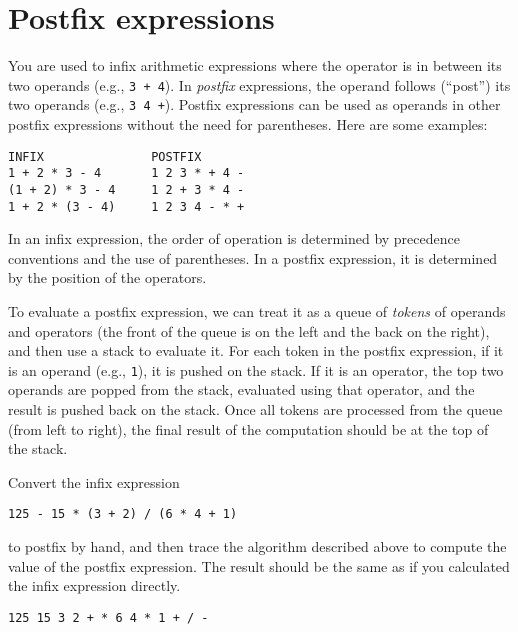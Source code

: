 \section*{Postfix expressions}

You are used to infix arithmetic expressions where the operator is in
between its two operands (e.g., \lstinline'3 + 4'). In \emph{postfix}
expressions, the operand follows (``post'') its two operands (e.g.,
\lstinline'3 4 +').  Postfix expressions can be used as operands in
other postfix expressions without the need for parentheses. Here are
some examples:

\begin{lstlisting}[basicstyle=\smallbasicstyle, belowskip=0pt]
INFIX               POSTFIX
1 + 2 * 3 - 4       1 2 3 * + 4 -
(1 + 2) * 3 - 4     1 2 + 3 * 4 -
1 + 2 * (3 - 4)     1 2 3 4 - * +
\end{lstlisting}
In an infix expression, the order of operation is determined by
precedence conventions and the use of parentheses.  In a postfix
expression, it is determined by the position of the operators.


To evaluate a postfix expression, we can treat it as a queue of
\emph{tokens} of operands and operators (the front of the queue is on
the left and the back on the right), and then use a stack to evaluate
it.  For each token in the postfix expression, if it is an operand
(e.g., \lstinline'1'), it is pushed on the stack. If it is an
operator, the top two operands are popped from the stack, evaluated
using that operator, and the result is pushed back on the stack. Once
all tokens are processed from the queue (from left to right), the
final result of the computation should be at the top of the stack.

\begin{part}
Convert the infix expression

\lstinline'125 - 15 * (3 + 2) / (6 * 4 + 1)'

to postfix by hand, and then trace the algorithm described above to compute the
value of the postfix expression. The result should be the same as if you
calculated the infix expression directly.
\end{part}
\onePT

\begin{solution}
\lstinline'125 15 3 2 + * 6 4 * 1 + / -'
\end{solution}
